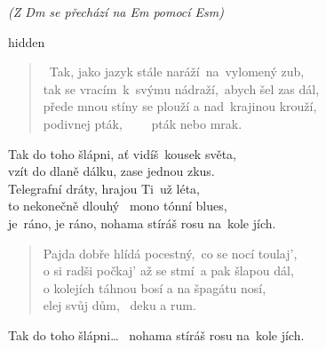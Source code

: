 \begin{song}{}
\begin{solo}
  \textit{(Z Dm se přechází na Em pomocí Esm)}
\end{solo}
  \begin{optional}{hidden}
\inlinechord{}     
  \end{optional}
\begin{verse}
   ~Tak, jako jazyk stále naráží~na~vylomený zub, \\
   tak se vracím~k~svýmu nádraží,~abych šel zas dál, \\
   přede mnou stíny se plouží a nad~krajinou krouží, \\
   podivnej pták, ~~~~pták nebo mrak.
\end{verse}
\begin{refren}
   Tak do toho šlápni, ať vidíš~kousek světa, \\
   vzít do dlaně dálku, zase jednou zkus. \\
   Telegrafní dráty, hrajou Ti~už léta, \\
   to nekonečně dlouhý ~mono tónní blues, \\
   je~ráno, je ráno, nohama stíráš rosu na~kole jích.
\end{refren}
\begin{verse}
   Pajda dobře hlídá pocestný,~co se nocí toulaj',  \\
   o si radši počkaj' až se stmí~a pak šlapou dál, \\
   o kolejích táhnou bosí a na špagátu nosí, \\
   elej svůj dům, ~deku a rum.
\end{verse}
\begin{refren}
   Tak do toho šlápni\ldots 
   ~nohama stíráš rosu na~kole jích.
\end{refren}
\end{song}
\begin{chords}
  \chordAdim
\end{chords}
\pagebreak
